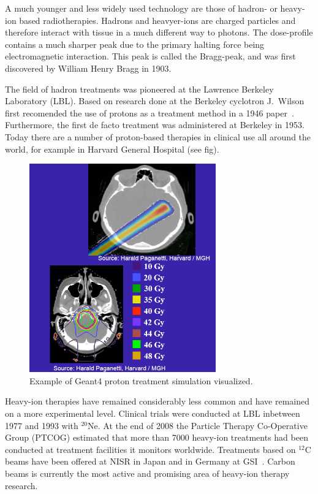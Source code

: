 A much younger and less widely used technology are those of hadron- or heavy-ion based radiotherapies. Hadrons and heavyer-ions are charged particles and therefore interact with tissue in a much different way to photons. The dose-profile contains a much sharper peak due to the primary halting force being electromagnetic interaction. This peak is called the Bragg-peak, and was first discovered by William Henry Bragg in 1903.

The field of hadron treatments was pioneered at the Lawrence Berkeley Laboratory (LBL). Based on research done at the Berkeley cyclotron J.~Wilson first recomended the use of protons as a treatment method in a 1946 paper~\cite{RW46}. Furthermore, the first de facto treatment was administered at Berkeley in 1953. Today there are a number of proton-based therapies in clinical use all around the world, for example in Harvard General Hospital (see fig). %
\begin{figure}[h]
\begin{center}
\includegraphics[height=9cm]{images/HarvardHadronTreatment.png}  
\caption{\label{fig:HarvardHadron} Example of Geant4 proton treatment simulation visualized.} 
\end{center}
\end{figure} 
Heavy-ion therapies have remained considerably less common and have remained on a more experimental level. Clinical trials were conducted at LBL inbetween 1977 and 1993 with $^{20}$Ne. At the end of 2008 the Particle Therapy Co-Operative  Group (PTCOG) estimated that more than 7000 heavy-ion treatments had been conducted at treatment facilities it monitors worldwide. Treatments based on $^{12}$C beams have been offered at NISR in Japan and in Germany at GSI~\cite{PTCOGstat}. Carbon beams is currently the most active and promising area of heavy-ion therapy research. 

